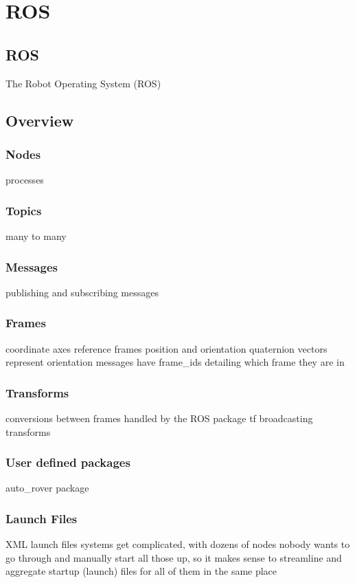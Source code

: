 \chapter{ROS}

\section{ROS}
The Robot Operating System (ROS)

\section{Overview}
\subsection{Nodes}
processes

\subsection{Topics}
many to many

\subsection{Messages}
publishing and subscribing messages

\subsection{Frames}
coordinate axes
reference frames
position and orientation
quaternion vectors represent orientation
messages have frame\_ids detailing which frame they are in

\subsection{Transforms}
conversions between frames
handled by the ROS package tf
broadcasting transforms


\subsection{User defined packages}
auto\_rover package

\subsection{Launch Files}
XML launch files
systems get complicated, with dozens of nodes
nobody wants to go through and manually start all those up, so it makes sense to streamline and aggregate startup (launch) files for all of them in the same place


